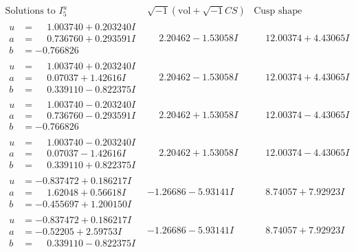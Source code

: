 \documentclass[1p]{elsarticle_modified}
\theoremstyle{definition}
\newcommand{\I}{\sqrt{-1}}
\begin{document}
$$\begin{array}{c|c|c}  
\text{Solutions to }I^u_{5}& \I (\text{vol} + \sqrt{-1}CS) & \text{Cusp shape}\\
 \hline 
\begin{aligned}
u &= \phantom{-}1.003740 + 0.203240 I \\
a &= \phantom{-}0.736760 + 0.293591 I \\
b &= -0.766826\phantom{ +0.000000I}\end{aligned}
 & \phantom{-}2.20462 - 1.53058 I & \phantom{-}12.00374 + 4.43065 I \\ \hline\begin{aligned}
u &= \phantom{-}1.003740 + 0.203240 I \\
a &= \phantom{-}0.07037 + 1.42616 I \\
b &= \phantom{-}0.339110 - 0.822375 I\end{aligned}
 & \phantom{-}2.20462 - 1.53058 I & \phantom{-}12.00374 + 4.43065 I \\ \hline\begin{aligned}
u &= \phantom{-}1.003740 - 0.203240 I \\
a &= \phantom{-}0.736760 - 0.293591 I \\
b &= -0.766826\phantom{ +0.000000I}\end{aligned}
 & \phantom{-}2.20462 + 1.53058 I & \phantom{-}12.00374 - 4.43065 I \\ \hline\begin{aligned}
u &= \phantom{-}1.003740 - 0.203240 I \\
a &= \phantom{-}0.07037 - 1.42616 I \\
b &= \phantom{-}0.339110 + 0.822375 I\end{aligned}
 & \phantom{-}2.20462 + 1.53058 I & \phantom{-}12.00374 - 4.43065 I \\ \hline\begin{aligned}
u &= -0.837472 + 0.186217 I \\
a &= \phantom{-}1.62048 + 0.56618 I \\
b &= -0.455697 + 1.200150 I\end{aligned}
 & -1.26686 - 5.93141 I & \phantom{-}8.74057 + 7.92923 I \\ \hline\begin{aligned}
u &= -0.837472 + 0.186217 I \\
a &= -0.52205 + 2.59753 I \\
b &= \phantom{-}0.339110 - 0.822375 I\end{aligned}
 & -1.26686 - 5.93141 I & \phantom{-}8.74057 + 7.92923 I \\ \hline\begin{aligned}

\end{aligned}
\end{array}$$
\end{document}
